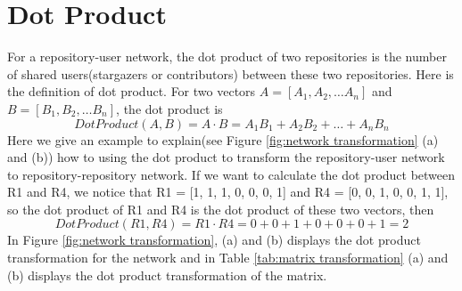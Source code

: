 \documentclass[12pt,oneside,final]{vlsithesis}
\begin{document}
\section{Dot Product}
For a repository-user network, the dot product\cite{strang2011introduction} of two repositories is the number of shared users(stargazers or contributors) between these two repositories. Here is the definition of dot product. For two vectors $ A = [A_{1}, A_{2}, \dots A_{n}]$  and $ B = [B_{1}, B_{2}, \dots B_{n}]$, the dot product is
\begin{equation*}
Dot Product(A,B) = A \cdot B = A_{1}B_{1} + A_{2}B_{2} + \dots + A_{n}B_{n}
\end{equation*}
Here we give an example to explain(see Figure \ref{fig:network transformation} (a) and (b)) how to using the dot product to transform the repository-user network to repository-repository network. If we want to calculate the dot product between R1 and R4, we notice that R1 = [1, 1, 1, 0, 0, 0, 1] and R4 = [0, 0, 1, 0, 0, 1, 1], so the dot product of R1 and R4 is the dot product of these two vectors, then 
\begin{equation*}
Dot Product(R1,R4) = R1 \cdot R4 = 0 + 0 + 1 + 0 + 0 + 0 + 1 =2
\end{equation*}
In Figure \ref{fig:network transformation}, (a) and (b) displays the dot product transformation for the network and in Table \ref{tab:matrix transformation} (a) and (b) displays the dot product transformation of the matrix.
\end{document}
